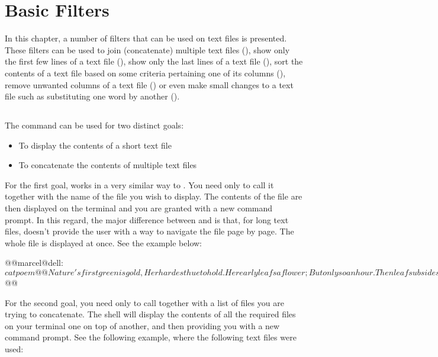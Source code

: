 \chapter{Basic Filters}\label{ch:filters}

In this chapter, a number of filters that can be used on text files is presented. These filters can be used to join (concatenate) multiple text files (), show only the first few lines of a text file (), show only the last lines of a text file (), sort the contents of a text file based on some criteria pertaining one of its columns (), remove unwanted columns of a text file () or even make small changes to a text file such as substituting one word by another ().

\section{}

The  command can be used for two distinct goals:
\begin{itemize}
\item To display the contents of a short text file
\item To concatenate the contents of multiple text files
\end{itemize}

For the first goal,  works in a very similar way to . You need only to call it together with the name of the file you wish to display. The contents of the file are then displayed on the terminal and you are granted with a new command prompt. In this regard, the major difference between  and  is that, for long text files,  doesn't provide the user with a way to navigate the file page by page. The whole file is displayed at once. See the example below:
\vspace{0.5cm}
\begin{command_line}[make]
@@marcel@dell:~$cat poem@@
Nature's first green is gold,
Her hardest hue to hold.
Her early leafs a flower;
But only so an hour.
Then leaf subsides to leaf.
So Eden sank to grief,
So dawn goes down to day.
Nothing gold can stay.
@@marcel@dell:~$ @@
\end{command_line}
\vspace{0.5cm}
For the second goal, you need only to call  together with a list of files you are trying to concatenate. The shell will display the contents of all the required files on your terminal one on top of another, and then providing you with a new command prompt. See the following example, where the following text files were used:

